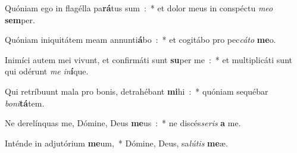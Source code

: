 \item Quóniam ego in flagélla pa\textbf{rá}tus sum~:~* et dolor meus in conspéctu \emph{me}\emph{o} \textbf{sem}per.
\item Quóniam iniquitátem meam annunti\textbf{á}bo~:~* et cogitábo pro pec\emph{cá}\emph{to} \textbf{me}o.
\item Inimíci autem mei vivunt, et confirmáti sunt \textbf{su}per me~:~* et multiplicáti sunt qui odérunt \emph{me} \emph{in}\textbf{í}que.
\item Qui retríbuunt mala pro bonis, detrahébant \textbf{mi}hi~:~* quóniam sequébar \emph{bo}\emph{ni}\textbf{tá}tem.
\item Ne derelínquas me, Dómine, Deus \textbf{me}us~:~* ne discés\emph{se}\emph{ris} \textbf{a} me.
\item Inténde in adjutórium \textbf{me}um,~* Dómine, Deus, sa\emph{lú}\emph{tis} \textbf{me}æ.